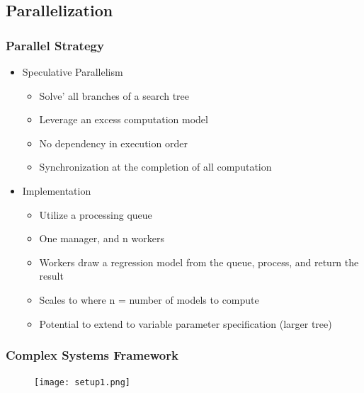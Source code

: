 \documentclass[usepdftitle=false,professionalfonts,compress ]{beamer}
\begin{document}
\subsection{Parallelization}



{
\begin{frame}\frametitle{}

\end{frame}
}








{
\begin{frame}\frametitle{Parallel Strategy}
	\begin{itemize}

		\item Speculative Parallelism
		\begin{itemize}

			\item Solve' all branches of a search tree
			\item Leverage an excess computation model
			\item No dependency in execution order
			\item Synchronization at the completion of all computation
		\end{itemize}
		\item Implementation
		\begin{itemize}

			\item Utilize a processing queue
			\item One manager, and n workers
			\item Workers draw a regression model from the queue, process, and return the result
			\item Scales to where n = number of models to compute
			\item Potential to extend to variable parameter specification (larger tree)
		\end{itemize}
	\end{itemize}

\end{frame}
}





{
\begin{frame}\frametitle{Complex Systems Framework}

\begin{figure}
	\texttt{[image: setup1.png]}\end{figure}
\end{frame}
}
\end{document}
